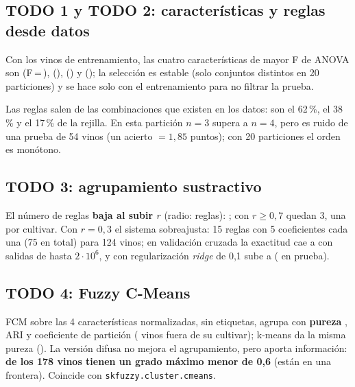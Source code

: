 \documentclass[11pt,letterpaper]{article}
\begin{document}
\subsection{TODO 1 y TODO 2: características y reglas desde datos}
Con los vinos de entrenamiento, las cuatro características de mayor F de ANOVA son \textbf{\cifratodoUnoA} (F\,=\,\cifratodoUnoFA), \textbf{\cifratodoUnoB} (\cifratodoUnoFB), \textbf{\cifratodoUnoC} (\cifratodoUnoFC) y \textbf{\cifratodoUnoD} (\cifratodoUnoFD);
la selección es estable (solo \cifrapropSelDistintas{} conjuntos distintos en 20 particiones) y se hace solo con el entrenamiento para no filtrar la prueba.

\begin{table}[H]
\centering\small
\caption{TODO 2: reglas de Wang--Mendel con 2, 3 y 4 etiquetas frente a la rejilla completa $n^4$.}

\end{table}

Las reglas salen de las combinaciones que existen en los datos: son el 62\,\%, el 38\,\% y el 17\,\% de la rejilla. En esta partición $n=3$ supera a $n=4$, pero es ruido de una prueba de 54 vinos (un acierto $=1{,}85$ puntos); con 20 particiones el orden es monótono.

\subsection{TODO 3: agrupamiento sustractivo}
\begin{table}[H]
\centering\small
\caption{TODO 3: \texttt{SugenoSustractivo} con $r=0{,}3$, $0{,}5$ y $0{,}8$ (salida redondeada y acotada a 1..3, NaN $\to$ 1).}

\end{table}

El número de reglas \textbf{baja al subir $r$} (radio: reglas): \cifrapropCurvaReglas; con $r\ge0{,}7$ quedan 3, una por cultivar. Con $r=0{,}3$ el sistema sobreajusta: 15 reglas con 5 coeficientes cada una (75 en total) para 124 vinos; en validación cruzada
la exactitud cae a \cifrapropRidgeSin{} con salidas de hasta $2\cdot10^{6}$, y con regularización \textit{ridge} de 0,1 sube a \cifrapropCvTresRidge{} (\cifrapropTestTresRidge{} en prueba).

\subsection{TODO 4: Fuzzy C-Means}
FCM sobre las 4 características normalizadas, sin etiquetas, agrupa con \textbf{pureza \cifrapropPureza}, ARI \cifrapropAri{} y coeficiente de partición \cifrapropFpc{} (\cifrapropMalAgrupados{} vinos fuera de su cultivar); k-means da la misma pureza (\cifrapropPurezaKm).
La versión difusa no mejora el agrupamiento, pero aporta información: \textbf{\cifrapropFrontera{} de los 178 vinos tienen un grado máximo menor de 0,6} (están en una frontera). Coincide con \texttt{skfuzzy.cluster.cmeans}.
\end{document}
